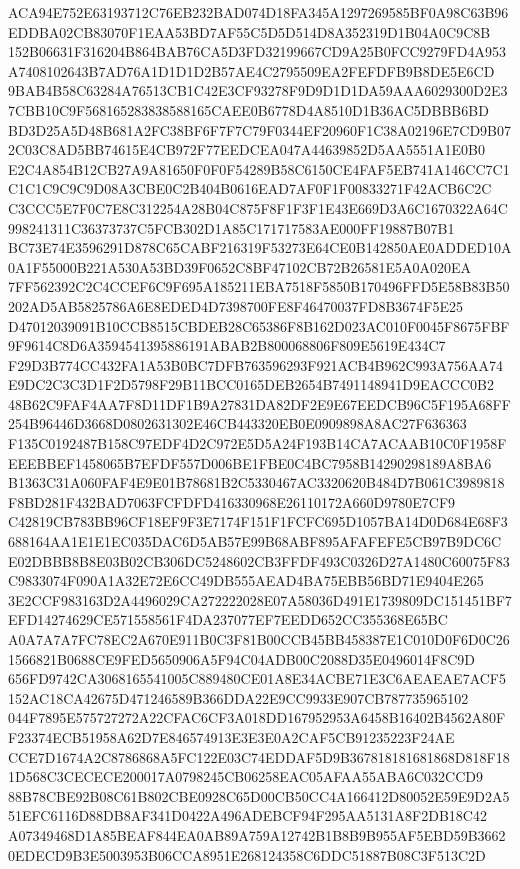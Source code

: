 \documentclass[UTF8,fontset=fandol,zihao=-4,a4paper]{ctexart}
\begin{document}
{{ACA94E752E63193712C76EB232BAD074D18FA345A1297269585BF0A98C63B96EDDBA02CB83070F1EAA53BD7AF55C5D5D514D8A352319D1B04A0C9C8B
152B06631F316204B864BAB76CA5D3FD32199667CD9A25B0FCC9279FD4A953A7408102643B7AD76A1D1D1D2B57AE4C2795509EA2FEFDFB9B8DE5E6CD
9BAB4B58C63284A76513CB1C42E3CF93278F9D9D1D1DA59AAA6029300D2E37CBB10C9F568165283838588165CAEE0B6778D4A8510D1B36AC5DBBB6BD
BD3D25A5D48B681A2FC38BF6F7F7C79F0344EF20960F1C38A02196E7CD9B072C03C8AD5BB74615E4CB972F77EEDCEA047A44639852D5AA5551A1E0B0
E2C4A854B12CB27A9A81650F0F0F54289B58C6150CE4FAF5EB741A146CC7C1C1C1C9C9C9D08A3CBE0C2B404B0616EAD7AF0F1F00833271F42ACB6C2C
C3CCC5E7F0C7E8C312254A28B04C875F8F1F3F1E43E669D3A6C1670322A64C998241311C36373737C5FCB302D1A85C171717583AE000FF19887B07B1
BC73E74E3596291D878C65CABF216319F53273E64CE0B142850AE0ADDED10A0A1F55000B221A530A53BD39F0652C8BF47102CB72B26581E5A0A020EA
7FF562392C2C4CCEF6C9F695A185211EBA7518F5850B170496FFD5E58B83B50202AD5AB5825786A6E8EDED4D7398700FE8F46470037FD8B3674F5E25
D47012039091B10CCB8515CBDEB28C65386F8B162D023AC010F0045F8675FBF9F9614C8D6A3594541395886191ABAB2B800068806F809E5619E434C7
F29D3B774CC432FA1A53B0BC7DFB763596293F921ACB4B962C993A756AA74E9DC2C3C3D1F2D5798F29B11BCC0165DEB2654B7491148941D9EACCC0B2
48B62C9FAF4AA7F8D11DF1B9A27831DA82DF2E9E67EEDCB96C5F195A68FF254B96446D3668D0802631302E46CB443320EB0E0909898A8AC27F636363
F135C0192487B158C97EDF4D2C972E5D5A24F193B14CA7ACAAB10C0F1958FEEEBBEF1458065B7EFDF557D006BE1FBE0C4BC7958B14290298189A8BA6
B1363C31A060FAF4E9E01B78681B2C5330467AC3320620B484D7B061C3989818F8BD281F432BAD7063FCFDFD416330968E26110172A660D9780E7CF9
C42819CB783BB96CF18EF9F3E7174F151F1FCFC695D1057BA14D0D684E68F3688164AA1E1E1EC035DAC6D5AB57E99B68ABF895AFAFEFE5CB97B9DC6C
E02DBBB8B8E03B02CB306DC5248602CB3FFDF493C0326D27A1480C60075F83C9833074F090A1A32E72E6CC49DB555AEAD4BA75EBB56BD71E9404E265
3E2CCF983163D2A4496029CA272222028E07A58036D491E1739809DC151451BF7EFD14274629CE571558561F4DA237077EF7EEDD652CC355368E65BC
A0A7A7A7FC78EC2A670E911B0C3F81B00CCB45BB458387E1C010D0F6D0C261566821B0688CE9FED5650906A5F94C04ADB00C2088D35E0496014F8C9D
656FD9742CA3068165541005C889480CE01A8E34ACBE71E3C6AEAEAE7ACF5152AC18CA42675D471246589B366DDA22E9CC9933E907CB787735965102
044F7895E575727272A22CFAC6CF3A018DD167952953A6458B16402B4562A80FF23374ECB51958A62D7E846574913E3E3E0A2CAF5CB91235223F24AE
CCE7D1674A2C8786868A5FC122E03C74EDDAF5D9B367818181681868D818F181D568C3CECECE200017A0798245CB06258EAC05AFAA55ABA6C032CCD9
88B78CBE92B08C61B802CBE0928C65D00CB50CC4A166412D80052E59E9D2A551EFC6116D88DB8AF341D0422A496ADEBCF94F295AA5131A8F2DB18C42
A07349468D1A85BEAF844EA0AB89A759A12742B1B8B9B955AF5EBD59B36620EDECD9B3E5003953B06CCA8951E268124358C6DDC51887B08C3F513C2D
}}
\end{document}

